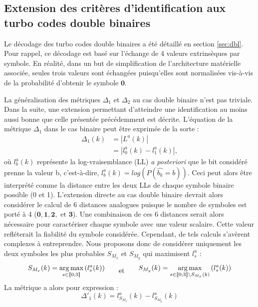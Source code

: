 \subsection{Extension des critères d'identification aux turbo codes double binaires}
Le décodage des turbo codes double binaires a été détaillé en section \ref{sec:dbl}. Pour rappel, ce décodage est basé
sur l'échange de 4 valeurs extrinsèques par symbole. En réalité, dans un but de simplification de 
l'architecture matérielle associée, seules trois valeurs sont échangées puisqu'elles sont normalisées vis-à-vis de 
la probabilité d'obtenir le symbole $\mathbf{0}$. 

La généralisation des métriques $\Delta_1$ et $\Delta_2$ au cas double binaire n'est pas triviale. Dans la suite, une 
extension permettant d'atteindre une identification au moins aussi bonne que celle présentée précédemment est décrite.
L'équation de la métrique $\Delta_1$ dans le cas binaire peut être exprimée de la sorte : 
\begin{align*}
\Delta_1(k) &= |L^a(k)|\\
			&= |l^a_0(k)-l^a_1(k)|,
\end{align*}
où $l^a_b(k)$ représente la log-vraisemblance (LL) \textit{a posteriori} que le bit considéré prenne la valeur b, 
c'est-à-dire, 
$l^a_b(k) = log\left(P(\hat{b_k} = b)\right)$. Ceci peut alors être interprété comme la distance entre les deux LLs de chaque 
symbole
binaire possible (0 et 1). L'extension directe au cas double binaire devrait alors considérer le calcul de 6 distances 
analogues puisque le
nombre de symboles est porté à 4 ($\mathbf{0}, \mathbf{1}, \mathbf{2}, \text{~et~} \mathbf{3}$). Une combinaison 
de ces 6 distances serait alors nécessaire pour caractériser chaque symbole avec une valeur scalaire. Cette valeur 
refléterait la fiabilité du symbole considérée. Cependant, de tels calculs s'avèrent complexes à entreprendre. Nous proposons
donc de considérer uniquement les deux symboles les plus probables $S_{M_x}$ et $S_{M_y}$ qui maximisent $l^a_s$ :
\begin{equation*}	\begin{split}
	S_{M_x}(k) = \operatorname*{arg\,max}\limits_{s\in\llbracket0;3\rrbracket}\left(l^a_s(k)\right)
	\end{split}\qquad\text{et}\qquad
	\begin{split}
		 S_{M_y}(k) = \operatorname*{arg\,max}\limits_{s\in\llbracket0;3\rrbracket\setminus{S_{M_x}(k)}}\left(l^a_s(k)\right)
	\end{split} 
\end{equation*}
La métrique a alors pour expression :
\begin{equation}
	\Delta'_1(k) = l^a_{S_{M_x}}(k)-l^a_{S_{M_y}}(k)
\end{equation}

